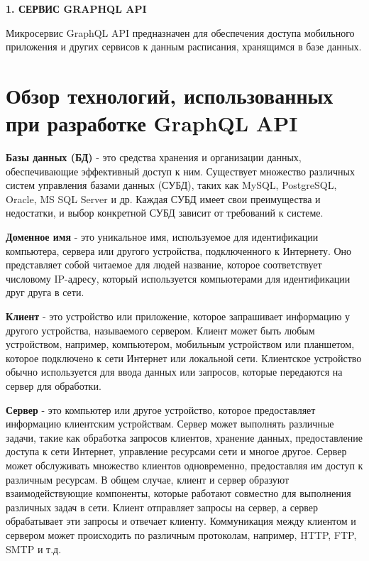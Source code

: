 \newpage
\begin{center}
    \textbf{\large 1. СЕРВИС GRAPHQL API}
\end{center}

Микросервис GraphQL API предназначен для обеспечения доступа мобильного приложения и других сервисов
к данным расписания, хранящимся в базе данных.

\section{Обзор технологий, использованных при разработке GraphQL API}

\textbf{Базы данных (БД)} - это средства хранения и организации данных,
обеспечивающие эффективный доступ к ним. Существует множество различных систем управления базами данных (СУБД),
таких как MySQL, PostgreSQL, Oracle, MS SQL Server и др.
Каждая СУБД имеет свои преимущества и недостатки, и выбор конкретной СУБД зависит от требований к системе.

\textbf{Доменное имя} - это уникальное имя, используемое для идентификации компьютера, сервера или другого устройства, подключенного к Интернету.
Оно представляет собой читаемое для людей название, которое соответствует числовому IP-адресу,
который используется компьютерами для идентификации друг друга в сети.

\textbf{Клиент} - это устройство или приложение, которое запрашивает информацию у другого устройства, называемого сервером. 
Клиент может быть любым устройством, например, компьютером, мобильным устройством или планшетом, 
которое подключено к сети Интернет или локальной сети. 
Клиентское устройство обычно используется для ввода данных или запросов, 
которые передаются на сервер для обработки.

\textbf{Сервер} - это компьютер или другое устройство, которое предоставляет информацию клиентским устройствам. 
Сервер может выполнять различные задачи, такие как обработка запросов клиентов, 
хранение данных, предоставление доступа к сети Интернет, управление ресурсами сети и многое другое.
Сервер может обслуживать множество клиентов одновременно, предоставляя им доступ к различным ресурсам. 
В общем случае, клиент и сервер образуют взаимодействующие компоненты,
которые работают совместно для выполнения различных задач в сети.
Клиент отправляет запросы на сервер, а сервер обрабатывает эти запросы и отвечает клиенту.
Коммуникация между клиентом и сервером может происходить по различным протоколам, например, HTTP, FTP, SMTP и т.д.

